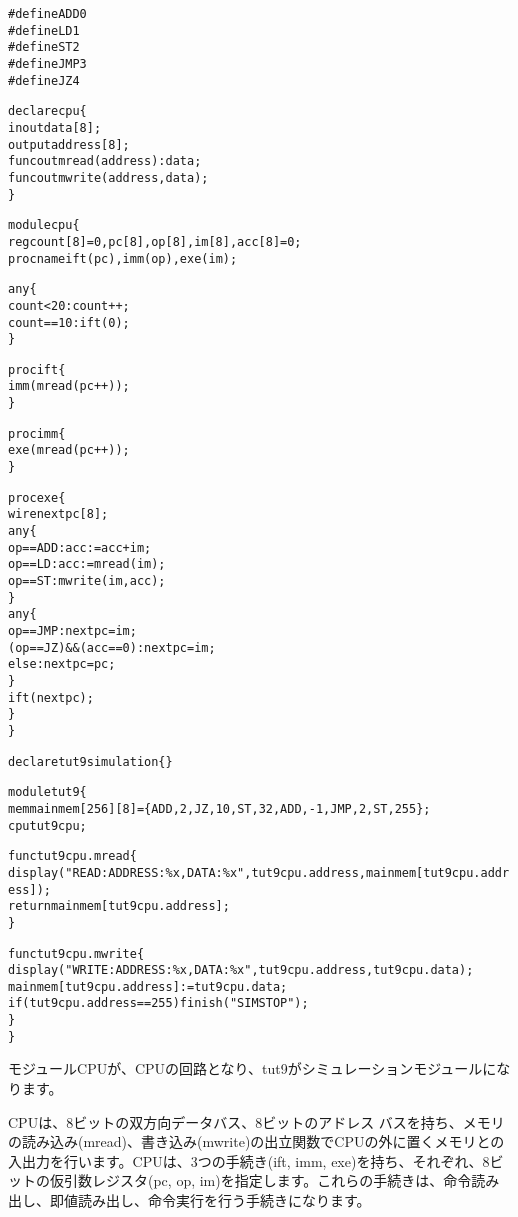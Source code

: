 \begin{reviewlist}
\begin{alltt}
\#define ADD 0
\#define LD  1
\#define ST  2
\#define JMP 3
\#define JZ  4

declare cpu \{
   inout data[8];
   output address[8];
   func\textunderscore{}out mread(address) : data;
   func\textunderscore{}out mwrite(address,data);
\}

module cpu \{
   reg count[8]=0, pc[8], op[8], im[8], acc[8]=0;
   proc\textunderscore{}name ift(pc), imm(op), exe(im);

   any \{
       count \textless{} 20: count++;
       count == 10: ift(0);
   \}

   proc ift \{
       imm(mread(pc++));
   \}

   proc imm \{
       exe(mread(pc++));
   \}

   proc exe \{
       wire nextpc[8];
       any \{
           op == ADD: acc:=acc+im;
           op == LD:  acc:=mread(im);
           op == ST:  mwrite(im,acc);
       \}
       any \{
           op == JMP: nextpc=im;
           (op == JZ) \&\& (acc == 0): nextpc=im;
           else: nextpc=pc;
       \}
       ift(nextpc);
   \}
\}


declare tut9 simulation \{\}

module tut9 \{
   mem mainmem[256][8] = \{ADD, 2, JZ, 10, ST, 32, ADD, -1, JMP, 2, ST, 255\};
   cpu tut9cpu;

   func tut9cpu.mread \{
       \textunderscore{}display("READ: ADDRESS:\%x, DATA:\%x", tut9cpu.address, mainmem[tut9cpu.address]);
       return mainmem[tut9cpu.address];
   \}

   func tut9cpu.mwrite \{
       \textunderscore{}display("WRITE: ADDRESS:\%x, DATA:\%x", tut9cpu.address, tut9cpu.data);
       mainmem[tut9cpu.address] := tut9cpu.data;
       if(tut9cpu.address == 255) \textunderscore{}finish("SIM STOP");
   \}
\}
\end{alltt}
\end{reviewlist}


モジュールCPUが、CPUの回路となり、tut9がシミュレーションモジュールになります。

CPUは、8ビットの双方向データバス、8ビットのアドレス バスを持ち、メモリの読み込み(mread)、書き込み(mwrite)の出立関数でCPUの外に置くメモリとの入出力を行います。CPUは、3つの手続き(ift, imm, exe)を持ち、それぞれ、8ビットの仮引数レジスタ(pc, op, im)を指定します。これらの手続きは、命令読み出し、即値読み出し、命令実行を行う手続きになります。

